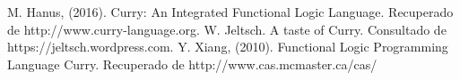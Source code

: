 \documentclass[10pt,journal,compsoc]{IEEEtran}
\begin{document}
\begin{thebibliography}{3}
	
	M. Hanus, (2016). Curry: An Integrated Functional Logic Language. Recuperado de http://www.curry-language.org.
	W. Jeltsch. A taste of Curry. Consultado de https://jeltsch.wordpress.com.
	Y. Xiang, (2010). Functional Logic Programming Language Curry. Recuperado de http://www.cas.mcmaster.ca/cas/
	

	
\end{thebibliography}
\end{document}
